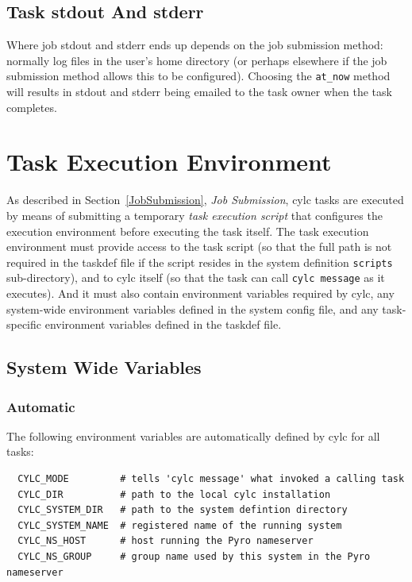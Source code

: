 \documentclass[11pt,a4paper]{article}
\begin{document}
\subsection{Task stdout And stderr}
\label{TaskstdoutAndstderr}

Where job stdout and stderr ends up depends on the job submission
method: normally log files in the user's home directory (or perhaps
elsewhere if the job submission method allows this to be configured).
Choosing the \lstinline=at_now= method will results in stdout and
stderr being emailed to the task owner when the task completes.

\pagebreak
\section{Task Execution Environment}
\label{TaskExecutionEnvironment}

As described in Section~\ref{JobSubmission}, {\em Job Submission}, cylc
tasks are executed by means of submitting a temporary {\em task
execution script} that configures the execution environment before
executing the task itself.  The task execution environment must provide
access to the task script (so that the full path is not required in the
taskdef file if the script resides in the system definition
\lstinline=scripts= sub-directory), and to cylc itself (so that the task
can call \lstinline=cylc message= as it executes). And it must also
contain environment variables required by cylc, any system-wide
environment variables defined in the system config file, and any
task-specific environment variables defined in the taskdef file.

\subsection{System Wide Variables}
\lstset{language=bash}

\subsubsection{Automatic}
The following environment variables are automatically defined by cylc
for all tasks:

\begin{lstlisting}
  CYLC_MODE         # tells 'cylc message' what invoked a calling task
  CYLC_DIR          # path to the local cylc installation
  CYLC_SYSTEM_DIR   # path to the system defintion directory
  CYLC_SYSTEM_NAME  # registered name of the running system 
  CYLC_NS_HOST      # host running the Pyro nameserver
  CYLC_NS_GROUP     # group name used by this system in the Pyro nameserver
\end{lstlisting}
\end{document}
